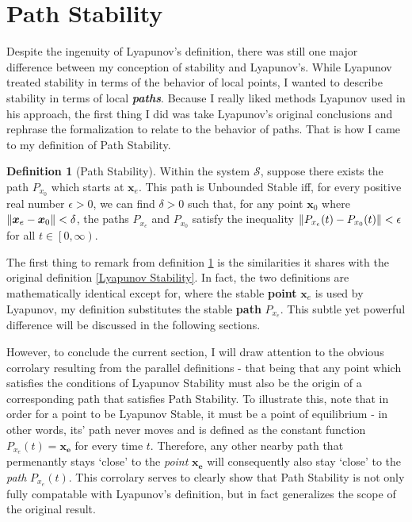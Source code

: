 \documentclass{article}
\newcommand{\B}[1]{\boldsymbol{#1}}
\DeclarePairedDelimiter\norm{\lVert}{\rVert}%
\theoremstyle{definition}
\newtheorem{definition}{Definition}[section]
\theoremstyle{remark}
\begin{document}
\section{Path Stability}
Despite the ingenuity of Lyapunov's definition, there was still one major difference between my conception of stability and Lyapunov's.
While Lyapunov treated stability in terms of the behavior of local points, I wanted to 
describe stability in terms of local \textbf{\textit{paths}}. Because I really liked
methods Lyapunov used in his approach, the first thing I did was take Lyapunov's original 
conclusions and rephrase the formalization to relate to the behavior of paths. That 
is how I came to my definition of Path Stability.

\begin{definition}[Path Stability]
  \label{def:Path Stability}
  Within the system $\mathcal{S}$, suppose there exists the path $P_{x_0}$ which starts at $\B{x}_e$.
  This path is Unbounded Stable iff, for every positive real number $\epsilon > 0$, we can find $\delta > 0$ such that,
  for any point $\B{x}_0$ where $\norm{\B{x}_e - \B{x}_0} < \delta$,
  the paths $P_{x_e}$ and $P_{x_0}$ satisfy the inequality 
  $\norm{P_{x_e}(t) - P_{x_0}(t)} < \epsilon$
  for all $t \in \left[0, \infty \right)$.
\end{definition}

The first thing to remark from definition \ref{def:Path Stability} is the similarities it shares
with the original definition \ref{Lyapunov Stability}. In fact, the two definitions are 
mathematically identical except for, where the stable \textbf{point} $\B{x}_e$ is used
by Lyapunov, my definition substitutes the stable \textbf{path} $P_{x_e}$. This subtle 
yet powerful difference will be discussed in the following sections. 

However, to conclude the current section, I will draw attention to the obvious corrolary resulting from the 
parallel definitions - that being that any point which satisfies the conditions of Lyapunov 
Stability must also be the origin of a corresponding path that satisfies Path Stability.
To illustrate this, note that in order for a point to be Lyapunov Stable, it must be 
a point of equilibrium - in other words, its' path never moves and is defined as the constant function 
$P_{x_e}(t) = \B{x_e}$ for every time $t$. Therefore, any other nearby path that permenantly stays 
`close' to the \textit{point} $\B{x_e}$ will consequently also stay `close' to the \textit{path} $P_{x_e}(t)$.
This corrolary serves to clearly show that Path Stability is not only fully compatable with Lyapunov's  
definition, but in fact generalizes the scope of the original result.  
\end{document}
